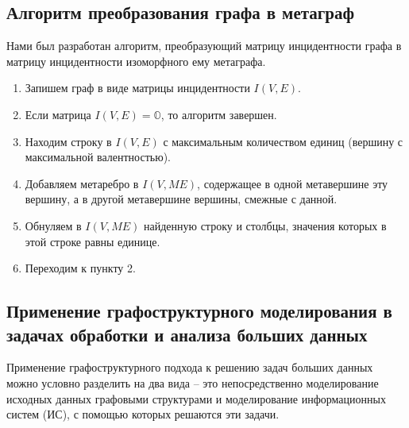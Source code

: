 \subsection{Алгоритм преобразования графа в метаграф}
Нами был разработан алгоритм, преобразующий матрицу инцидентности графа в матрицу инцидентности изоморфного ему метаграфа.
\begin{enumerate}
	\item Запишем граф в виде матрицы инцидентности $I(V,E)$.
	\item Если матрица $I(V,E)=\mathbb{O}$, то алгоритм завершен.
	\item Находим строку в $I(V,E)$ с максимальным количеством единиц (вершину с максимальной валентностью).
	\item Добавляем метаребро в $I(V,ME)$, содержащее в одной метавершине эту вершину, а в другой метавершине вершины, смежные с данной.
	\item Обнуляем в $I(V,ME)$ найденную строку и столбцы, значения которых в этой строке равны единице.
	\item Переходим к пункту 2.
\end{enumerate}

\subsection{Применение графоструктурного моделирования в задачах обработки и анализа больших данных}

Применение графоструктурного подхода к решению задач больших данных можно условно разделить на два вида -- это непосредственно моделирование исходных данных графовыми структурами и моделирование информационных систем (ИС), с помощью которых решаются эти задачи. 

